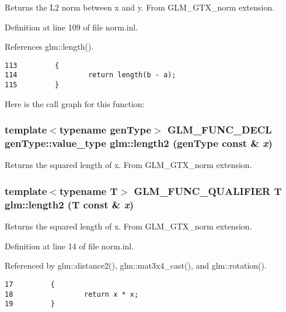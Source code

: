 Returns the L2 norm between x and y. From GLM\_\-GTX\_\-norm extension. 

Definition at line 109 of file norm.inl.

References glm::length().

\begin{Code}\begin{verbatim}113         {
114                 return length(b - a);
115         }
\end{verbatim}
\end{Code}




Here is the call graph for this function:\hypertarget{group__gtx__norm_g2dfcdff0cc9119aa37c501d2c7a45020}{
\subsubsection[length2]{\setlength{\rightskip}{0pt plus 5cm}template$<$typename genType$>$ GLM\_\-FUNC\_\-DECL genType::value\_\-type glm::length2 (genType const \& {\em x})}}
\label{group__gtx__norm_g2dfcdff0cc9119aa37c501d2c7a45020}


Returns the squared length of x. From GLM\_\-GTX\_\-norm extension. \hypertarget{group__gtx__norm_g6f970aba05e1299ed89d2ec3a410b7a9}{
\subsubsection[length2]{\setlength{\rightskip}{0pt plus 5cm}template$<$typename T$>$ GLM\_\-FUNC\_\-QUALIFIER T glm::length2 (T const \& {\em x})}}
\label{group__gtx__norm_g6f970aba05e1299ed89d2ec3a410b7a9}


Returns the squared length of x. From GLM\_\-GTX\_\-norm extension. 

Definition at line 14 of file norm.inl.

Referenced by glm::distance2(), glm::mat3x4\_\-cast(), and glm::rotation().

\begin{Code}\begin{verbatim}17         {
18                 return x * x;
19         }
\end{verbatim}
\end{Code}




